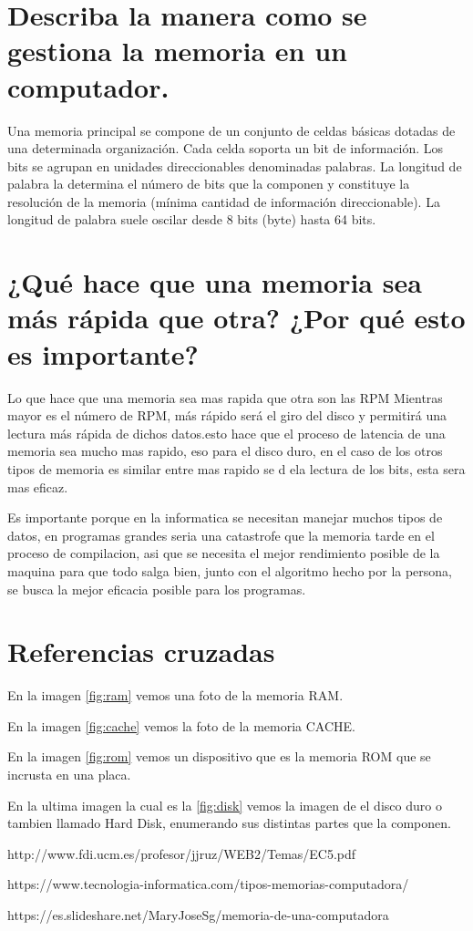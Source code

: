 \documentclass{article}
\begin{document}
\newpage

\section{Describa la manera como se gestiona la memoria en un computador.}

Una memoria principal se compone de un conjunto de celdas básicas dotadas de una
determinada organización. Cada celda soporta un bit de información. Los bits se agrupan en unidades
direccionables denominadas palabras. La longitud de palabra la determina el número de bits que la
componen y constituye la resolución de la memoria (mínima cantidad de información direccionable).
La longitud de palabra suele oscilar desde 8 bits (byte) hasta 64 bits. 

\section{¿Qué hace que una memoria sea más rápida que otra? ¿Por qué esto es importante?}

Lo que hace que una memoria sea mas rapida que otra son las RPM Mientras mayor es el número de RPM, más rápido será el giro del disco y permitirá una lectura más rápida de dichos datos.esto hace que el proceso de latencia de una memoria sea mucho mas rapido, eso para el disco duro, en el caso de los otros tipos de memoria es similar entre mas rapido se d ela lectura de los bits, esta sera mas eficaz.

Es importante porque en la informatica se necesitan manejar muchos tipos de datos, en programas grandes seria una catastrofe que la memoria tarde en el proceso de compilacion, asi que se necesita el mejor rendimiento posible de la maquina para que todo salga bien, junto con el algoritmo hecho por la persona, se busca la mejor eficacia posible para los programas.


\section*{Referencias cruzadas}

En la imagen \ref{fig:ram} vemos una foto de la memoria RAM.

En la imagen \ref{fig:cache} vemos la foto de la memoria CACHE.

En la imagen \ref{fig:rom} vemos un dispositivo que es la memoria        ROM que se incrusta en una placa.

En la ultima imagen la cual es la \ref{fig:disk} vemos la imagen de el disco duro o tambien llamado Hard Disk, enumerando sus distintas partes que la componen.




http://www.fdi.ucm.es/profesor/jjruz/WEB2/Temas/EC5.pdf

https://www.tecnologia-informatica.com/tipos-memorias-computadora/

https://es.slideshare.net/MaryJoseSg/memoria-de-una-computadora
\end{document}
